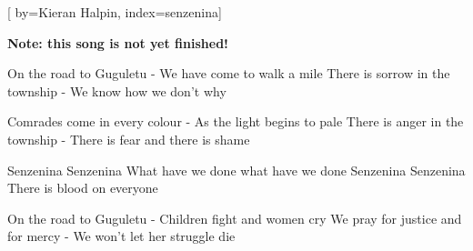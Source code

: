 

[%
    by={Kieran Halpin},
    index={senzenina}]


    \label{senzenina}

    \textbf{Note: this song is not yet finished!}

    \beginverse
        On the road to Guguletu - We have come to walk a mile
        There is sorrow in the township - We know how we don’t why
    \endverse

    \beginverse
        Comrades come in every colour - As the light begins to pale
        There is anger in the township - There is fear and there is shame
    \endverse

    \beginchorus
        Senzenina    Senzenina   What have we done what have we done
        Senzenina    Senzenina  There is blood on everyone
    \endchorus

    \beginverse
        On the road to Guguletu - Children fight and women cry
        We pray for justice and for mercy - We won't let her struggle die
    \endverse
\endsong
